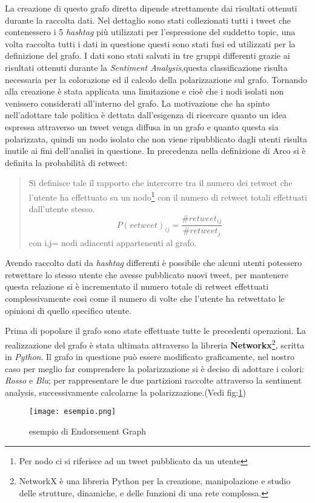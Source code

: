La creazione di questo grafo diretta dipende strettamente dai risultati ottenuti durante la raccolta dati. Nel dettaglio sono stati collezionati tutti i tweet che contenessero i 5 \textit{hashtag} più utilizzati per l'espressione del suddetto topic, una volta raccolta tutti i dati in questione questi sono stati fusi ed utilizzati per la definizione del grafo. I dati sono stati salvati in tre gruppi differenti grazie ai risultati ottenuti durante la \textit{Sentiment Analysis},questa classificazione risulta necessaria per la colorazione ed il calcolo della polarizzazione sul grafo. Tornando alla creazione è stata applicata una limitazione e cioè che i nodi isolati non venissero considerati all'interno del grafo. La motivazione che ha spinto nell'adottare tale politica è dettata dall'esigenza di ricercare quanto un idea espressa attraverso un tweet venga diffusa in un grafo e quanto questa sia polarizzata, quindi un nodo isolato che non viene ripubblicato dagli utenti risulta inutile ai fini dell'analisi in questione.
In precedenza nella definizione di Arco si è definita la probabilità di retweet:
\begin{quote}
Si definisce tale il rapporto che intercorre tra il numero dei retweet che l'utente ha effettuato su un nodo\footnote{Per nodo ci si riferisce ad un tweet pubblicato da un utente} con il numero di retweet totali effettuati dall'utente stesso.
\begin{equation}
 P(retweet)_{ij} = \dfrac{\#retweet_{ij}}{\#retweet_{j}} 
\end{equation}
 con i,j= nodi adiacenti appartenenti al grafo.
 \end{quote}
 Avendo raccolto dati da \textit{hashtag} differenti è possibile che alcuni utenti potessero retwettare lo stesso utente che avesse pubblicato nuovi tweet, per mantenere questa relazione si è incrementato il numero totale di retweet effettuati complessivamente così come il numero di volte che l'utente ha retwettato le opinioni di quello specifico utente. 

Prima di popolare il grafo sono state effettuate tutte le precedenti operazioni. La realizzazione del grafo è stata ultimata attraverso la libreria \textbf{Networkx}\footnote{NetworkX è una libreria Python per la creazione, manipolazione e studio delle strutture, dinamiche, e delle funzioni di una rete complessa.}, scritta in \textit{Python}.
Il grafo in questione può essere modificato graficamente, nel nostro caso per meglio far comprendere la polarizzazione si è deciso di adottare i colori: 	\textit{Rosso} e \textit{Blu}; per rappresentare le due partizioni raccolte attraverso la sentiment analysis, successivamente calcolarne la polarizzazione.(Vedi fig:\ref{endorsement})
\begin{figure}[!h]
    \begin{center}
      \texttt{[image: esempio.png]}
		\caption{esempio di Endorsement Graph}
	\label{endorsement}
    \end{center}
  \end{figure}
\newpage
